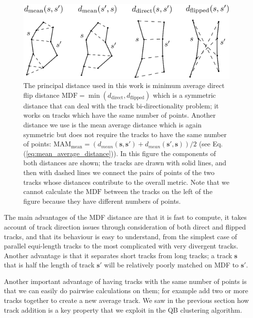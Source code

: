 \documentclass{bioinfo}
\begin{document}
\begin{methods}
\begin{figure}
\includegraphics[scale=0.35]{Figures/Fig_2_distances2}
\centering{}
\caption{The principal distance used in this work is minimum average direct flip
distance $\textrm{MDF}=\min(d_{\textrm{direct}},d_{\textrm{flipped}})$ which is
a symmetric distance that can deal with the track bi-directionality problem; it
works on tracks which have the same number of points.  Another distance we use is the
mean average distance which is again symmetric but does not require the tracks
to have the same number of points:
$\textrm{MAM}_{\textrm{mean}}=(d_{mean}(\mathbf{s},\mathbf{s'})+d_{mean}(\mathbf{s'},\mathbf{s}))/2$ (see Eq.
(\ref{eq:mean_average_distance})).  In this figure the components of both
distances are shown; the tracks are drawn with solid lines, and then with dashed
lines we connect the pairs of points of the two tracks whose distances
contribute to the overall metric. Note that we cannot calculate the
$\textrm{MDF}$ between the tracks on the left of the figure because they have
different numbers of points.
\label{Flo:Distances_used}}
\end{figure}

The main advantages of the MDF distance are that it is fast to compute,
it takes account of track direction issues through consideration of both
direct and flipped tracks, and that its behaviour is easy to understand,
from the simplest case of parallel equi-length tracks to the most
complicated with very divergent tracks. Another advantage is that it
separates short tracks from long tracks; a track $\mathbf{s}$ that is half the
length of track $\mathbf{s'}$ will be relatively poorly matched on MDF to $\mathbf{s'}$.

Another important advantage of having tracks with the same number of points is
that we can easily do pairwise calculations on them; for example add two or more
tracks together to create a new average track. We saw in the previous section
how track addition is a key property that we exploit in the QB clustering
algorithm.


\end{methods}
\end{document}
